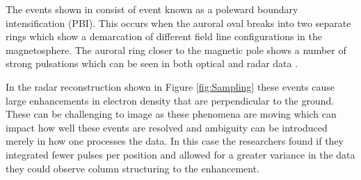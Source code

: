 The events shown in \cite{Semeter:2005fo} consist of event known as a poleward boundary intensification (PBI). This occurs when the auroral oval breaks into two separate rings which show a demarcation of different field line configurations in the magnetosphere. The auroral ring closer to the magnetic pole shows a number of strong pulsations which can be seen in both optical and radar data \cite{Semeter:2005fo} .

In the radar reconstruction shown in Figure \ref{fig:Sampling} these events cause large enhancements in electron density that are perpendicular to the ground. These can be challenging to image as these phenomena are moving which can impact how well these events are resolved and ambiguity can be introduced merely in how one processes the data. In this case the researchers found if they integrated fewer pulses per position and allowed for a greater variance in the data they could observe column structuring to the enhancement.

